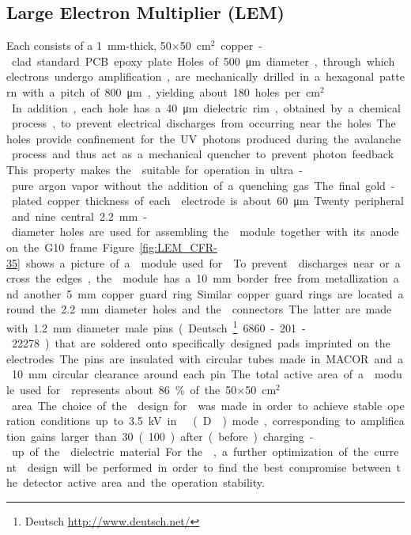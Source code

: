 \subsection{Large Electron Multiplier (LEM)}
\label{sec:fddp-crp-lem}

Each  consists of a \SI{1}{mm}-thick,  \num{50}$\times$\SI{50}{cm$^{2}$} copper-clad standard PCB epoxy plate. Holes of \SI{500}{\micro\meter} diameter, through which electrons undergo amplification, are mechanically drilled in a hexagonal pattern with a pitch of \SI{800}{\micro\meter}, yielding about \num{180} holes per \si{cm$^2$}. In addition, each hole has a  \SI{40}{\micro\meter} dielectric rim, obtained by a chemical process, to prevent electrical discharges from occurring near the holes. The holes provide confinement for the UV photons produced during the avalanche process and thus act as a mechanical quencher to prevent photon feedback. This property makes the  suitable for operation in ultra-pure argon vapor without the addition of a quenching gas. The final gold-plated copper thickness of each  electrode is about  \SI{60}{\micro\meter}. Twenty peripheral and nine central \SI{2.2}{mm}-diameter holes are used for assembling the  module together with its anode on the G10 frame. Figure~\ref{fig:LEM_CFR-35} shows a picture of a  module used for  . To prevent  discharges near or across the edges, the  module has a  \SI{10}{mm} border free from metallization and another \SI{5}{mm} copper guard ring. Similar copper guard rings are located around the \SI{2.2}{mm} diameter holes and the  connectors. The latter are made with \SI{1.2}{mm} diameter male pins (Deutsch~\footnote{Deutsch\texttrademark{} \url{http://www.deutsch.net/}} 6860-201-22278.) that are soldered onto specifically designed pads imprinted on the  electrodes. The pins are insulated with circular tubes made in MACOR and a  \SI{10}{mm} circular clearance around each pin. 

The total active area of a  module used for   represents about \SI{86}{\%} of the \num{50}$\times$\SI{50}{cm$^{2}$} area. The choice of the  design for   was made in order to achieve stable operation conditions up to \SI{3.5}{kV} in \dual \lar (D\lar{}) mode, corresponding to amplification gains larger than \num{30} (\num{100}) after (before) charging-up of the  dielectric material. For the , a further optimization of the current  design will  be performed in order  to find the best compromise between the detector active area and the operation stability.

